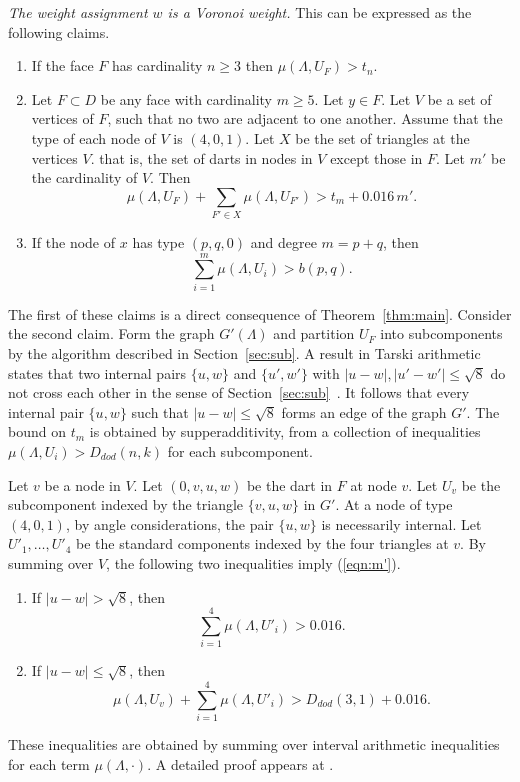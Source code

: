 \documentclass{article} %
\begin{document}
{\it The weight assignment $w$ is a Voronoi weight.}
This can be expressed as the following claims.
\begin{enumerate}
\item If the face $F$  has cardinality $n\ge3$ then $\mu(\Lambda,U_F)> t_n$.
\item Let $F\subset D$ 
be any face with cardinality $m \ge 5$.  Let $y\in F$.
Let $V$ be a set of vertices of $F$, such
that no two are adjacent to one another.  
Assume that the type of each node of $V$ is $(4,0,1)$.
Let $X$ be the set of triangles at the vertices $V$.
that is, the set of darts in nodes in $V$ except those in $F$.
Let $m'$ be the cardinality of $V$.
Then
\begin{equation}\label{eqn:m'}
\mu(\Lambda,U_F) + \sum_{F'\in X} \mu(\Lambda,U_{F'}) > t_m  +  0.016\, m'.
\end{equation}
\item If the node of $x$ has type $(p,q,0)$ and degree $m=p+q$, then
  \begin{equation}\label{eqn:pq}
  \sum_{i=1}^m \mu(\Lambda,U_i) > b(p,q).
  \end{equation}
\end{enumerate}

The first of these claims is a direct consequence of
Theorem~\ref{thm:main}. Consider the second claim. Form the graph
$G'(\Lambda)$ and partition $U_F$ into subcomponents by the algorithm
described in Section~\ref{sec:sub}. A result in Tarski arithmetic
states that two internal pairs $\{u,w\}$ and $\{u',w'\}$ with
$|u-w|,|u'-w'|\le\sqrt8$ do not cross each other in the sense of
Section~\ref{sec:sub}~\cite[Sec.~7.2.1]{Hales:2002:Dodec}. It
follows that every internal pair $\{u,w\}$ such that $|u-w|\le\sqrt8$
forms an edge of the graph $G'$. The bound on $t_m$ is obtained by
supperadditivity, from a collection of inequalities
$\mu(\Lambda,U_i)>D_{dod}(n,k)$ for each subcomponent.

Let $v$  be a node in $V$.  Let $(0,v,u,w)$ be the dart in $F$
at node $v$.  Let $U_v$ be the subcomponent indexed by the
triangle $\{v,u,w\}$ in $G'$.
At a node of type $(4,0,1)$, by angle considerations,
the pair $\{u,w\}$ is necessarily internal.
Let $U'_1,\ldots,U'_4$ be the standard components indexed
by the four triangles at $v$. 
By summing over $V$, the following two inequalities
imply (\ref{eqn:m'}).
\begin{enumerate}
\item If $|u-w|>\sqrt8$, then
  $$
  \sum_{i=1}^4\mu(\Lambda,U'_i) > 0.016.
  $$
\item If $|u-w|\le\sqrt8$, then
  $$
  \mu(\Lambda,U_v)+ \sum_{i=1}^4\mu(\Lambda,U'_i) > D_{dod}(3,1) + 0.016.
  $$
\end{enumerate}
These inequalities are obtained by summing over interval arithmetic
inequalities for each term $\mu(\Lambda,\cdot)$.   
A detailed proof appears at \cite[Theorem~8.1]{Hales:2002:Dodec}.
\end{document}

